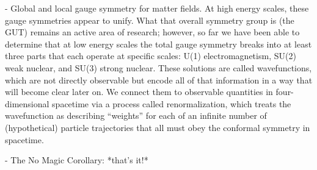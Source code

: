   - Global and local gauge symmetry for matter fields. At high energy scales, these gauge symmetries appear to unify. What that overall symmetry group is (the GUT) remains an active area of research; however, so far we have been able to determine that at low energy scales the total gauge symmetry breaks into at least three parts that each operate at specific scales: U(1) electromagnetism, SU(2) weak nuclear, and SU(3) strong nuclear. These solutions are called wavefunctions, which are not directly observable but encode all of that information in a way that will become clear later on. We connect them to observable quantities in four-dimensional spacetime via a process called renormalization, which treats the wavefunction as describing ``weights'' for each of an infinite number of (hypothetical) particle trajectories that all must obey the conformal symmetry in spacetime.

- The No Magic Corollary: *that's it!*
